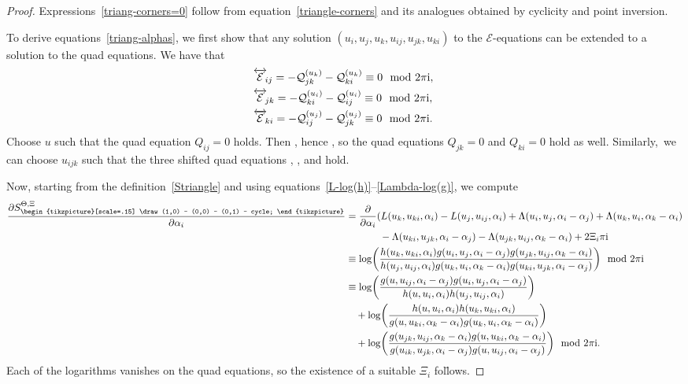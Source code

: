\documentclass[pdftex]{sigma}
\newcommand{\inversion}[1]{\!\overleftrightarrow{\,#1\,}\!}
\newcommand{\triang}{{\begin{tikzpicture}[scale=.15]
			\draw (1,0) -- (0,0) -- (0,1) -- cycle;
\end{tikzpicture}}}
\newcommand{\pdv}[2]{\frac{\partial {#1}}{\partial {#2}}}
\numberwithin{equation}{section}
\begin{document}
\begin{proof}
 Expressions~\eqref{triang-corners=0} follow from equation~\eqref{triangle-corners} and its analogues obtained by cyclicity and point inversion.

 To derive equations~\eqref{triang-alphas}, we first show that any solution $(u_i,u_j,u_k,u_{ij},u_{jk},u_{ki})$ to the $\mathcal{E}$-equations can be extended to a solution to the quad equations. We have that
 \begin{align*}
 & \inversion{\mathcal{E}}_{ij} = -\mathcal{Q}^{(u_k)}_{jk} - \mathcal{Q}^{(u_k)}_{ki} \equiv 0 \mod 2 \pi {\rm i} , \\
 & \inversion{\mathcal{E}}_{jk} = -\mathcal{Q}^{(u_i)}_{ki} - \mathcal{Q}^{(u_i)}_{ij} \equiv 0 \mod 2 \pi {\rm i} , \\
 & \inversion{\mathcal{E}}_{ki} = -\mathcal{Q}^{(u_j)}_{ij} - \mathcal{Q}^{(u_j)}_{jk} \equiv 0 \mod 2 \pi {\rm i} .
 \end{align*}
 Choose $u$ such that the quad equation $Q_{ij} = 0$ holds. Then , hence , so the quad equations $Q_{jk} = 0$ and $Q_{ki} = 0$ hold as well. Similarly,~we can choose $u_{ijk}$ such that the three shifted quad equations \smash{$\inversion{Q}_{ij} = 0$}, \smash{$\inversion{Q}_{jk} = 0$}, and \smash{$\inversion{Q}_{ki} = 0$} hold.

\allowdisplaybreaks Now, starting from the definition~\eqref{Striangle} and using equations~\eqref{L-log(h)}--\eqref{Lambda-log(g)}, we compute
 \begin{align*}
	\pdv{S^{\Theta,\Xi}_\triang}{\alpha_i} &=
	\pdv{}{\alpha_i} ( L(u_k,u_{ki},\alpha_i) - L(u_j,u_{ij},\alpha_i) + \Lambda(u_i,u_{j},\alpha_i-\alpha_j) + \Lambda(u_k,u_{i},\alpha_k-\alpha_i)\\
	&\hphantom{=\pdv{}{\alpha_i} ( }{}\, - \Lambda(u_{ki}, u_{jk}, \alpha_i-\alpha_j) - \Lambda(u_{jk},u_{ij},\alpha_k-\alpha_i ) + 2 \Xi_i \pi {\rm i} \\
	&\equiv \log\biggl( \frac{h(u_k,u_{ki},\alpha_i)g(u_i,u_{j},\alpha_i-\alpha_j)g(u_{jk},u_{ij},\alpha_k-\alpha_i)}{h(u_j,u_{ij},\alpha_i)g(u_k,u_{i},\alpha_k-\alpha_i)g(u_{ki}, u_{jk}, \alpha_i-\alpha_j)} \biggr) \mod 2 \pi {\rm i} \\
	&\equiv \log\biggl( \frac{g(u, u_{ij}, \alpha_i-\alpha_j) g(u_i,u_j,\alpha_i-\alpha_j)}{h(u,u_{i},\alpha_i)h(u_j,u_{ij},\alpha_i)} \biggr) \\
	& \quad + \log\biggl( \frac{h(u,u_{i},\alpha_i)h(u_k,u_{ki},\alpha_i)}{g(u, u_{ki}, \alpha_k-\alpha_i)g(u_k,u_i,\alpha_k-\alpha_i)} \biggr) \\
	& \quad + \log\biggl( \frac{g(u_{jk},u_{ij},\alpha_k-\alpha_i)g(u,u_{ki},\alpha_k-\alpha_i)}{g(u_{ik},u_{jk},\alpha_i-\alpha_j)g(u,u_{ij},\alpha_i-\alpha_j) } \biggr) \mod 2 \pi {\rm i} .
\end{align*}
Each of the logarithms vanishes on the quad equations, so the existence of a suitable $\Xi_i$ fol\=lows.
\end{proof}
\end{document}
